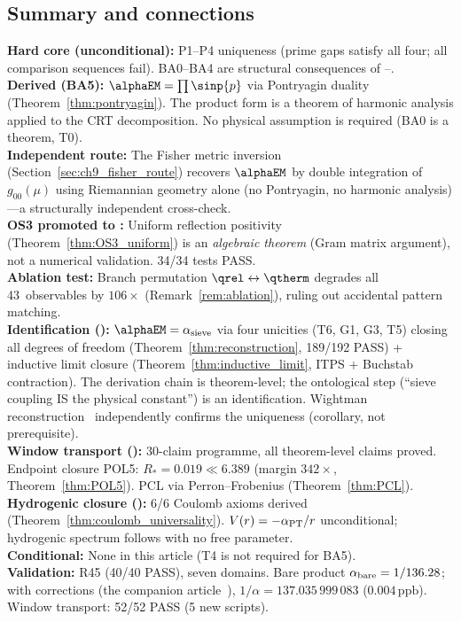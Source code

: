 \documentclass[12pt,a4paper]{article}
\begin{document}
\subsection{Summary and connections}
\label{sec:ch9_summary}

\begin{ledgerbox}
\textbf{Hard core (unconditional):} P1--P4 uniqueness (prime gaps
  satisfy all four; all comparison sequences fail). BA0--BA4 are
  structural consequences of \cite{companion_M1}--\cite{companion_M3}.\\[4pt]
\textbf{Derived (BA5):} $\alphaEM = \prod \sinp{p}$ via Pontryagin
  duality (Theorem~\ref{thm:pontryagin}). The product form is a
  theorem of harmonic analysis applied to the CRT decomposition.
  No physical assumption is required (BA0 is a theorem, T0).\\[4pt]
\textbf{Independent route:} The Fisher metric inversion
  (Section~\ref{sec:ch9_fisher_route}) recovers $\alphaEM$ by double
  integration of $g_{00}(\mu)$ using Riemannian geometry alone
  (no Pontryagin, no harmonic analysis)---a structurally
  independent cross-check.\\[4pt]
\textbf{OS3 promoted to \THMTAG:} Uniform reflection positivity
  (Theorem~\ref{thm:OS3_uniform}) is an \emph{algebraic theorem}
  (Gram matrix argument), not a numerical validation.
  34/34 tests PASS.\\[4pt]
\textbf{Ablation test:} Branch permutation $\qrel \leftrightarrow
  \qtherm$ degrades all 43~observables by $106\times$
  (Remark~\ref{rem:ablation}), ruling out accidental pattern matching.\\[4pt]
\textbf{Identification (\BRIDGETAG):} $\alphaEM = \alpha_{\rm sieve}$
  via four unicities (T6, G1, G3, T5) closing all degrees of freedom
  (Theorem~\ref{thm:reconstruction}, 189/192 PASS) + inductive limit
  closure (Theorem~\ref{thm:inductive_limit}, ITPS + Buchstab contraction).
  The derivation chain is theorem-level; the ontological step
  (``sieve coupling IS the physical constant'') is an identification.
  Wightman reconstruction~\cite{StreaterWightman1964} independently
  confirms the uniqueness (corollary, not prerequisite).\\[4pt]
\textbf{Window transport (\THMTAG):} 30-claim programme, all
  theorem-level claims proved. Endpoint closure POL5:
  $R_* = 0.019 \ll 6.389$ (margin $342\times$,
  Theorem~\ref{thm:POL5}). PCL via Perron--Frobenius
  (Theorem~\ref{thm:PCL}).\\[4pt]
\textbf{Hydrogenic closure (\THMTAG):} 6/6 Coulomb axioms derived
  (Theorem~\ref{thm:coulomb_universality}).
  $V(r) = -\alpha_{\rm PT}/r$ unconditional; hydrogenic spectrum
  follows with no free parameter.\\[4pt]
\textbf{Conditional:} None in this article (T4 is not required for BA5).\\[4pt]
\textbf{Validation:} R45 (40/40 PASS), seven domains. Bare product
  $\alpha_{\rm bare} = 1/136.28$; with corrections (the companion article~\cite{companion_physics}),
  $1/\alpha = 137.035\,999\,083$ ($0.004\,\mathrm{ppb}$).
  Window transport: 52/52 PASS (5 new scripts).
\end{ledgerbox}
\end{document}

